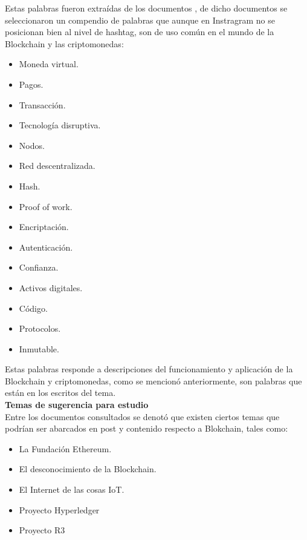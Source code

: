 \documentclass[12pt,letterpaper]{article}
\begin{document}
\noindent Estas palabras fueron extraídas de los documentos \cite{deloitte} \cite{asobancaria} \cite{equisoft} \cite{bbva}, de dicho documentos se seleccionaron un compendio de palabras que aunque en Instragram no se posicionan bien al nivel de hashtag, son de uso común en el mundo de la Blockchain y las criptomonedas:

\begin{itemize}
	\item Moneda virtual.
	\item Pagos.
	\item Transacción.
	\item Tecnología disruptiva.
	\item Nodos.
	\item Red descentralizada.
	\item Hash.
	\item Proof of work.
	\item Encriptación.
	\item Autenticación.
	\item Confianza.
	\item Activos digitales.
	\item Código.
	\item Protocolos.
	\item Inmutable.
\end{itemize}

\noindent Estas palabras responde a descripciones del funcionamiento y aplicación de la Blockchain y criptomonedas, como se mencionó anteriormente, son palabras que están en los escritos del tema.\\

\noindent \textbf{Temas de sugerencia para estudio}\\

\noindent Entre los documentos consultados se denotó que existen ciertos temas que podrían ser abarcados en post y contenido respecto a Blokchain, tales como:

\begin{itemize}
	\item La Fundación Ethereum.
	\item El desconocimiento de la Blockchain.
	\item El Internet de las cosas IoT.
	\item Proyecto Hyperledger
	\item Proyecto R3
\end{itemize}
\end{document}
